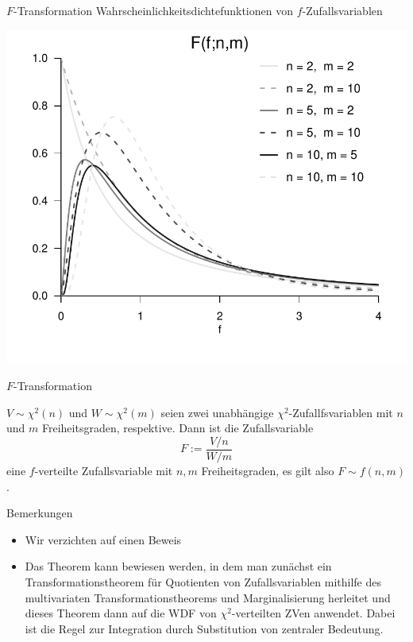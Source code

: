 \documentclass[
  8pt,
  ignorenonframetext,
]{beamer}
\providecommand{\tightlist}{%
  \setlength{\itemsep}{0pt}\setlength{\parskip}{0pt}}
\begin{document}
\begin{frame}{\(F\)-Transformation}
\protect\hypertarget{f-transformation-1}{}
Wahrscheinlichkeitsdichtefunktionen von \(f\)-Zufallsvariablen
\vspace{5mm} \center

\begin{center}\includegraphics[width=0.7\linewidth]{8_Abbildungen/wtfi_8_f_wdf} \end{center}
\vfill
\end{frame}

\begin{frame}{\(F\)-Transformation}
\protect\hypertarget{f-transformation-2}{}
\small
\begin{theorem}[$F$-Transformation]
\justifying
\normalfont
$V \sim \chi^2(n)$ und $W \sim \chi^2(m)$ seien zwei unabhängige
$\chi^2$-Zufallfsvariablen mit $n$ und $m$ Freiheitsgraden, respektive.
Dann ist die Zufallsvariable
\begin{equation}
F := \frac{V/n}{W/m}
\end{equation}
eine $f$-verteilte Zufallsvariable mit $n,m$ Freiheitsgraden, es gilt also $F \sim f(n,m)$.
\end{theorem}

\footnotesize

Bemerkungen

\begin{itemize}
\tightlist
\item
  Wir verzichten auf einen Beweis
\item
  Das Theorem kann bewiesen werden, in dem man zunächst ein
  Transformationstheorem für Quotienten von Zufallsvariablen mithilfe
  des multivariaten Transformationstheorems und Marginalisierung
  herleitet und dieses Theorem dann auf die WDF von
  \(\chi^2\)-verteilten ZVen anwendet. Dabei ist die Regel zur
  Integration durch Substitution von zentraler Bedeutung.
\end{itemize}
\end{frame}
\end{document}
